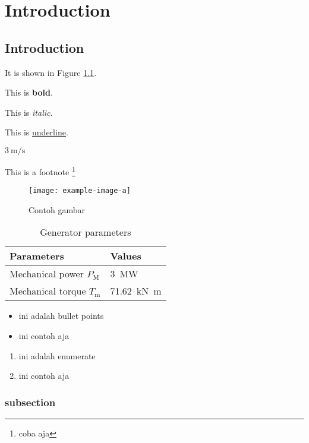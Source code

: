 \chapter{Introduction}

\section{Introduction}

It is shown in Figure \ref{fig:main}.

This is \textbf{bold}.

This is \textit{italic}.

This is \underline{underline}.

$\SI{3}{\meter\per\second}$

This is a footnote \footnote{coba aja}		
				
\begin{figure}[!hb]
	\centering
	\texttt{[image: example-image-a]}
	\caption{Contoh gambar}
	\label{fig:main}
\end{figure}		

\begin{table}[!h]
	\caption{Generator parameters}
	\label{tab:genparameters}
	\centering
	\begin{tabular}{ll}
		\toprule
		Parameters & Values \\
		\midrule
		Mechanical power $P_{\mathrm{M}}$ & \SI{3}{\mega\watt} \\
		Mechanical torque $T_{\mathrm{m}}$ & \SI{71.62}{\kilo\newton\meter} \\
		\bottomrule
	\end{tabular}
\end{table}

\newpage

\begin{itemize}
	\item ini adalah bullet points
	\item ini contoh aja
\end{itemize}

\begin{enumerate}
	\item ini adalah enumerate
	\item ini contoh aja
\end{enumerate}

\subsection{subsection}
